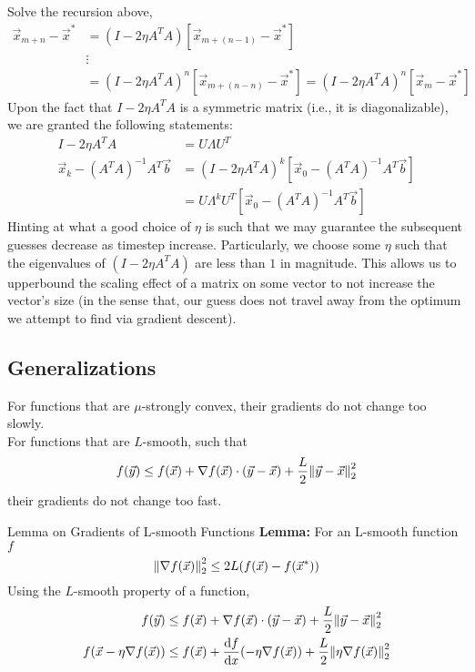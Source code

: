 Solve the recursion above,
\begin{align*}
    \vec{x}_{m + n} - \vec{x}^*
    &= (I - 2 \eta A^T A) [\vec{x}_{m + (n - 1)} - \vec{x}^*] \\
    &\vdots \\
    &= {(I - 2 \eta A^T A)}^n [\vec{x}_{m + (n - n)} - \vec{x}^*]
    = {(I - 2 \eta A^T A)}^n [\vec{x}_m - \vec{x}^*]
\end{align*}
Upon the fact that $I - 2 \eta A^T A$ is a symmetric matrix (i.e., it is diagonalizable), we are granted the following statements:
\begin{align*}
    I - 2 \eta A^T A &= U \Lambda U^T \\
    \vec{x}_k - {(A^T A)}^{-1} A^T \vec{b}
    &= {(I - 2 \eta A^T A)}^k [\vec{x}_0 - {(A^T A)}^{-1} A^T \vec{b}] \\
    &= U \Lambda^k U^T [\vec{x}_0 - {(A^T A)}^{-1} A^T \vec{b}]
\end{align*}
Hinting at what a good choice of $\eta$ is such that we may guarantee the subsequent guesses decrease as timestep increase.
Particularly, we choose some $\eta$ such that the eigenvalues of $(I - 2 \eta A^T A)$ are less than $1$ in magnitude.
This allows us to upperbound the scaling effect of a matrix on some vector to not increase the vector's size (in the sense that, our guess does not travel away from the optimum we attempt to find via gradient descent).

\subsection{Generalizations}
For functions that are $\mu$-strongly convex, their gradients do not change too slowly. \\
For functions that are $L$-smooth, such that
\[
    f(\vec{y}) \leq f(\vec{x}) + \nabla f(\vec{x}) \cdot (\vec{y} - \vec{x}) + \frac{L}{2} \pnorm[2]{\vec{y} - \vec{x}}{2}
\]
their gradients do not change too fast.

\begin{ln-theorem}{Lemma on Gradients of L-smooth Functions}{}
    \textbf{Lemma:} For an L-smooth function $f$
    \[
        \pnorm[2]{\nabla f(\vec{x})}{2} \leq 2L (f(\vec{x}) - f(\vec{x}^*))
    \]
    \tcblower
    Using the $L$-smooth property of a function,
    \begin{align*}
        f(\vec{y})
        &\leq f(\vec{x}) + \nabla f(\vec{x}) \cdot (\vec{y} - \vec{x}) + \frac{L}{2} \pnorm[2]{\vec{y} - \vec{x}}{2} \\
        f(\vec{x} - \eta \nabla f(\vec{x}))
        &\leq f(\vec{x}) + \dv{f}{x} {} (-\eta \nabla f(\vec{x})) + \frac{L}{2} \pnorm[2]{\eta \nabla f(\vec{x})}{2}
    \end{align*}
\end{ln-theorem}
